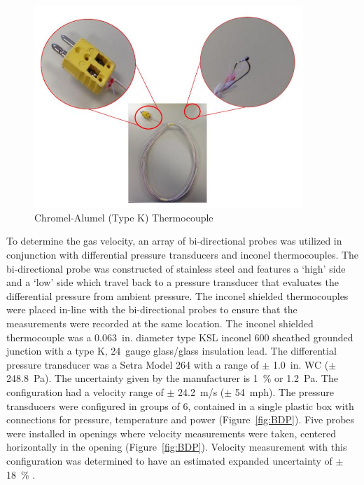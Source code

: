 \documentclass[12pt,oneside]{book}
\begin{document}
\begin{figure} [H]
	\centering
	\includegraphics[width = 4in]{0_Images/Instrumentation/Thermocouple.jpg}
	\caption{Chromel-Alumel (Type K) Thermocouple}
	\label{fig:Thermocouple}
\end{figure}

To determine the gas velocity, an array of bi-directional probes was utilized in conjunction with differential pressure transducers and inconel thermocouples. The bi-directional probe was constructed of stainless steel and features a `high' side and a `low' side which travel back to a pressure transducer that evaluates the differential pressure from ambient pressure. The inconel shielded thermocouples were placed in-line with the bi-directional probes to ensure that the measurements were recorded at the same location. The inconel shielded thermocouple was a 0.063~in. diameter type KSL inconel 600 sheathed grounded junction with a type K, 24~gauge glass/glass insulation lead. The differential pressure transducer was a Setra Model 264 with a range of $\pm$ 1.0~in. WC ($\pm$ 248.8~Pa). The uncertainty given by the manufacturer is 1~\% or 1.2~Pa. The configuration had a velocity range of $\pm$ 24.2~m/s ($\pm$ 54~mph). The pressure transducers were configured in groups of 6, contained in a single plastic box with connections for pressure, temperature and power (Figure~\ref{fig:BDP}). Five probes were installed in openings where velocity measurements were taken, centered horizontally in the opening (Figure~\ref{fig:BDP}). Velocity measurement with this configuration was determined to have an estimated expanded uncertainty of $\pm$ 18~\% \cite{BDPInPoolFires}.
\end{document}
